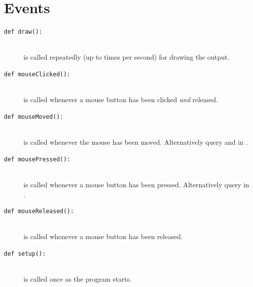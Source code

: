 \section{Events}
\begin{description}
\item[\texttt{def draw():}] \hfill \\
	is called repeatedly (up to  times per second) for drawing the output.
\item[\texttt{def mouseClicked():}] \hfill \\
	is called whenever a mouse button has been clicked \emph{and} released.
\item[\texttt{def mouseMoved():}] \hfill \\
	is called whenever the mouse has been moved. Alternatively query  and  in .
\item[\texttt{def mousePressed():}] \hfill \\
	is called whenever a mouse button has been pressed. Alternatively query  in .
\item[\texttt{def mouseReleased():}] \hfill \\
	is called whenever a mouse button has been released.
\item[\texttt{def setup():}] \hfill \\
	is called once as the program starts.
\end{description}

